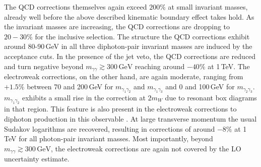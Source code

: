 The QCD corrections themselves again exceed $200\%$ at 
small invariant masses, already well before the above 
described kinematic boundary effect takes hold. 
As the invariant masses are increasing, the 
QCD corrections are dropping to $20-30\%$ for the inclusive 
selection. 
The structure the QCD corrections exhibit around 80-90\,GeV 
in all three diphoton-pair invariant masses are induced by 
the acceptance cuts.
In the presence of the jet veto, the QCD corrections are 
reduced and turn negative beyond $m_{\gamma\gamma}\gtrsim 300\,\text{GeV}$ 
reaching around $-40\%$ at 1\,TeV. 
The electroweak corrections, on the other hand, are 
again moderate, ranging from $+1.5\%$ between 70 and 200\,GeV 
for $m_{\gamma_1\gamma_2}$ and $m_{\gamma_1\gamma_3}$ and 
0 and 100\,GeV for $m_{\gamma_2\gamma_3}$. 
$m_{\gamma_1\gamma_2}$ exhibits a small rise in the correction 
at $2m_W$ due to resonant box diagrams in that region. 
This feature is also present in the electroweak corrections 
to diphoton production in this observable \cite{Chiesa:2017gqx}. 
At large transverse momentum the usual Sudakov logarithms 
are recovered, resulting in corrections of around 
$-8\%$ at 1\,TeV for all photon-pair invariant masses. 
Most importantly, beyond $m_{\gamma\gamma}\gtrsim 300\,\text{GeV}$, 
the electroweak corrections are again not covered by the LO 
uncertainty estimate.

